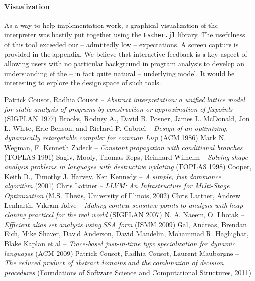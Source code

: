 \documentclass[11pt]{article}
\begin{document}
\paragraph{Visualization}
As a way to help implementation work, a graphical visualization of the interpreter was hastily put together using the \verb~Escher.jl~ library\cite{escher}.
The usefulness of this tool exceeded our -- admittedly low -- expectations. A screen capture is provided in the appendix.
We believe that interactive feedback is a key aspect of allowing users with no particular background in program analysis to develop an understanding of the -- in fact quite natural -- underlying model.
It would be interesting to explore the design space of such tools.

\newpage
\begin{thebibliography}{9}
\small
{} Patrick Cousot, Radhia Cousot -- \emph{Abstract interpretation: a unified lattice model for static analysis of programs by construction or approximation of fixpoints} (SIGPLAN 1977)
 Brooks, Rodney A., David B. Posner, James L. McDonald, Jon L. White, Eric Benson, and Richard P. Gabriel -- \emph{Design of an optimizing, dynamically retargetable compiler for common Lisp} (ACM 1986)
 Mark N. Wegman, F. Kenneth Zadeck -- \emph{Constant propagation with conditional branches} (TOPLAS 1991)
 Sagiv, Mooly, Thomas Reps, Reinhard Wilhelm -- \emph{Solving shape-analysis problems in languages with destructive updating} (TOPLAS 1998)
 Cooper, Keith D., Timothy J. Harvey, Ken Kennedy -- \emph{A simple, fast dominance algorithm} (2001)
 Chris Lattner -- \emph{LLVM: An Infrastructure for Multi-Stage Optimization} (M.S. Thesis, University of Illinois, 2002)
 Chris Lattner, Andrew Lenharth, Vikram Adve -- \emph{Making context-sensitive points-to analysis with heap cloning practical for the real world} (SIGPLAN 2007)
 N. A. Naeem, O. Lhotak -- \emph{Efficient alias set analysis using SSA form} (ISMM 2009)
 Gal, Andreas, Brendan Eich, Mike Shaver, David Anderson, David Mandelin, Mohammad R. Haghighat, Blake Kaplan et al -- \emph{Trace-based just-in-time type specialization for dynamic languages} (ACM 2009)
 Patrick Cousot, Radhia Cousot, Laurent Mauborgne -- \emph{The reduced product of abstract domains and the combination of decision procedures} (Foundations of Software Science and Computational Structures, 2011)

\end{thebibliography}
\end{document}
